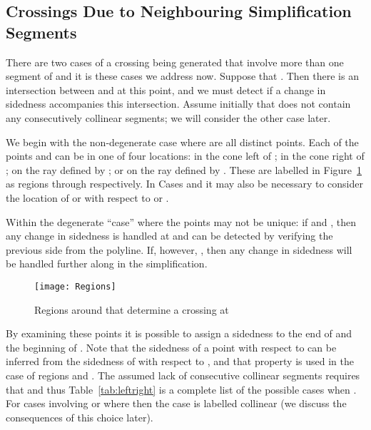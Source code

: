 \documentclass{article}
\begin{document}
\subsection{Crossings Due to Neighbouring Simplification Segments}
\label{sect:xmultiplesegment}

There are two cases of a crossing being generated that involve more than one segment of  and it
is these cases we address now.  Suppose that .  Then there is
an intersection between  and  at this point, and we must detect if a
change in sidedness accompanies this intersection.  Assume initially
that  does not contain any consecutively collinear segments; we will
consider the other case later.  

We begin with the non-degenerate case where  
are all distinct points. Each of the
points  and  can be in one of four locations: in the cone
left of ; in the cone right of
; on the ray defined by ; or on the ray
defined by .  These are labelled in Figure~\ref{fig:locations} as 
regions  through  respectively.  In Cases  and  it
may also be necessary to consider the location of  or
 with respect to  or .

Within the degenerate ``case'' where the points may not be unique: if   and , then any change in sidedness is handled at  and can be detected by verifying the
previous side from the polyline.  If, however, , then any change in
sidedness will be handled further along in the simplification.
	
\begin{figure}
\texttt{[image: Regions]}
\caption{Regions around  that determine a crossing at }
\label{fig:locations}
\end{figure}

By examining these points it is possible to assign a sidedness to
the end of  and the beginning of
.  Note that the sidedness of a point  with
respect to  can be inferred from the sidedness of  with
respect to , and that property is used in the case of
regions  and . 
The assumed lack of consecutive collinear segments requires that
 and thus Table~\ref{tab:leftright} is a
complete list of the possible cases when .
For cases involving  or  where  then the case
is labelled collinear (we discuss the consequences of this choice later).
\end{document}
